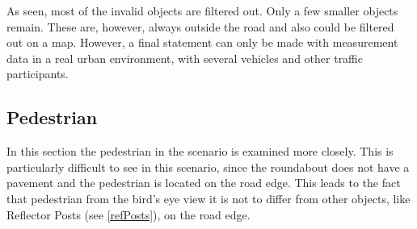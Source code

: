 \documentclass[11pt,oneside,openright]{mpreport}
\begin{document}
As seen, most of the invalid objects are filtered out. Only a few smaller objects remain.
These are, however, always outside the road and also could be filtered out on a map.
However, a final statement can only be made with measurement data in a real urban environment, with several vehicles and other traffic participants.

\subsection{Pedestrian}
In this section the pedestrian in the scenario is examined more closely. This is particularly difficult to see in this scenario, 
since the roundabout does not have a pavement and the pedestrian is located on the road edge.
This leads to the fact that pedestrian from the bird's eye view it is not to differ from other objects, like Reflector Posts (see \cref{refPosts}), on the road edge.
\end{document}
